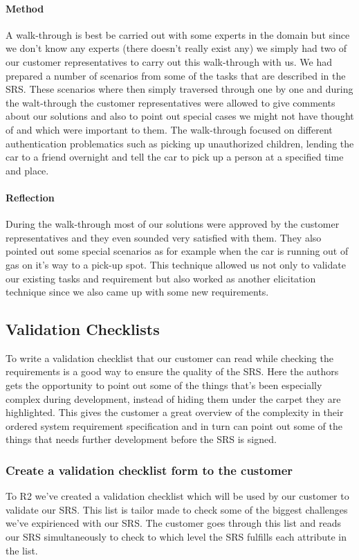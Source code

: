 \documentclass[10pt]{article}
\begin{document}
\paragraph{Method}
\hfill \break
A walk-through is best be carried out with some experts in the domain but since we don't know any experts (there doesn't really exist any) we simply had two of our customer representatives to carry out this walk-through with us.
We had prepared a number of scenarios from some of the tasks that are described in the SRS. These scenarios where then simply traversed through one by one and during the walt-through the customer representatives were allowed to give comments about our solutions and also to point out special cases we might not have thought of and which were important to them.
The walk-through focused on different authentication problematics such as picking up unauthorized children, lending the car to a friend overnight and tell the car to pick up a person at a specified time and place.
\paragraph{Reflection}
\hfill \break
During the walk-through most of our solutions were approved by the customer representatives and they even sounded very satisfied with them.
They also pointed out some special scenarios as for example when the car is running out of gas on it's way to a pick-up spot.
This technique allowed us not only to validate our existing tasks and requirement but also worked as another elicitation technique since we also came up with some new requirements.

\subsection{Validation Checklists}
To write a validation checklist that our customer can read while checking the requirements is a good way to ensure the quality of the SRS. Here the authors gets the opportunity to point out some of the things that's been especially complex during development, instead of hiding them under the carpet they are highlighted. This gives the customer a great overview of the complexity in their ordered system requirement specification and in turn can point out some of the things that needs further development before the SRS is signed.
\subsubsection{Create a validation checklist form to the customer}
To R2 we've created a validation checklist which will be used by our customer to validate our SRS. This list is tailor made to check some of the biggest challenges we've expirienced with our SRS. The customer goes through this list and reads our SRS simultaneously to check to which level the SRS fulfills each attribute in the list.
\end{document}
